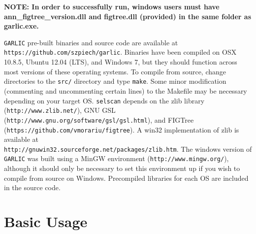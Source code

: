\documentclass[12pt]{article}%
\begin{document}
{\bf NOTE: In order to successfully run, windows users must have ann\_figtree\_version.dll and figtree.dll (provided) in the same folder as garlic.exe.}

{\tt GARLIC} pre-built binaries and source code are available at {\tt https://github.com/szpiech/garlic}.  Binaries have been compiled on OSX 10.8.5, Ubuntu 12.04 (LTS), and Windows 7, but they should function across most versions of these operating systems.  To compile from source, change directories to the {\tt src/} directory and type {\tt make}.  Some minor modification (commenting and uncommenting certain lines) to the Makefile may be necessary depending on your target OS.  {\tt selscan} depends on the zlib library ({\tt http://www.zlib.net/}), GNU GSL ({\tt http://www.gnu.org/software/gsl/gsl.html}), and FIGTree \\({\tt https://github.com/vmorariu/figtree}). A win32 implementation of zlib is available at \\{\tt http://gnuwin32.sourceforge.net/packages/zlib.htm}.  The windows version of {\tt GARLIC} was built using a MinGW environment ({\tt http://www.mingw.org/}), although it should only be necessary to set this environment up if you wish to compile from source on Windows. Precompiled libraries for each OS are included in the source code.

\section{Basic Usage}
\end{document}
